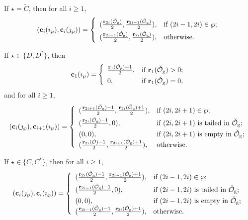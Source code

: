\documentclass[12pt,a4paper]{amsart}
\newcommand{\CO}{{\mathcal {O}}}
\numberwithin{equation}{section}
\theoremstyle{remark}
\begin{document}
If $\star=\widetilde{C}$, then for all $i\geq 1$,
\[
(\mathbf c_{i}(\imath_\wp), \mathbf c_{i}(\jmath_\wp))=
   \left\{
     \begin{array}{ll}
           (\frac{\mathbf r_{2i}(\check \CO_{\mathrm g})}{2},  \frac{\mathbf r_{2i-1}(\check \CO_{\mathrm g})}{2}), &\hbox{if $(2i-1, 2i)\in \wp$}; \smallskip\\
            (\frac{\mathbf r_{2i-1}(\check \CO_{\mathrm g})}{2},  \frac{\mathbf r_{2i}(\check \CO_{\mathrm g})}{2}), &\hbox{otherwise}.\\
            \end{array}
   \right.
\]


If $\star\in\{D,D^*\}$, then
 \[
   \mathbf c_{1}(\imath_\wp)= \left\{
     \begin{array}{ll}
            \frac{\mathbf r_1(\check \CO_{\mathrm g})+1}{2},   &\hbox{if $\mathbf r_1(\check \CO_{\mathrm g})>0$}; \smallskip\\
       0,  &\hbox{if $\mathbf r_1(\check \CO_{\mathrm g})=0$},\\
            \end{array}
   \right.
 \]
and for all $i\geq 1$,
\[
(\mathbf c_{i}(\jmath_\wp), \mathbf c_{i+1}(\imath_\wp))=
   \left\{
     \begin{array}{ll}
            (\frac{\mathbf r_{2i+1}(\check \CO_{\mathrm g})-1}{2},  \frac{\mathbf r_{2i}(\check \CO_{\mathrm g})+1}{2}), &\hbox{if $(2i, 2i+1)\in \wp$}; \smallskip\\
        (\frac{\mathbf r_{2i}(\check \CO_{\mathrm g})-1}{2},  0), & \hbox{if $(2i, 2i+1)$ is tailed in $\check \CO_{\mathrm g}$};\smallskip\\
         (0,  0), &\hbox{if $(2i, 2i+1)$ is empty in $\check \CO_{\mathrm g}$};\\
         (\frac{\mathbf r_{2i}(\check \CO)-1}{2},  \frac{\mathbf r_{2i+1}(\check \CO_{\mathrm g})+1}{2}), &\hbox{otherwise}.\\
            \end{array}
   \right.
\]


If $\star\in\{C,C^*\}$, then for all $i\geq 1$,
\[
(\mathbf c_{i}(\jmath_\wp), \mathbf c_{i}(\imath_\wp))=
   \left\{
     \begin{array}{ll}
            (\frac{\mathbf r_{2i}(\check \CO_{\mathrm g})-1}{2},  \frac{\mathbf r_{2i-1}(\check \CO_{\mathrm g})+1}{2}), &\hbox{if $(2i-1, 2i)\in \wp$}; \smallskip\\
        (\frac{\mathbf r_{2i-1}(\check \CO_{\mathrm g})-1}{2},  0), & \hbox{if $(2i-1, 2i)$ is tailed in $\check \CO_{\mathrm g}$};\smallskip\\
         (0,  0), &\hbox{if $(2i-1, 2i)$ is empty in $\check \CO_{\mathrm g}$};\\
         (\frac{\mathbf r_{2i-1}(\check \CO_{\mathrm g})-1}{2},  \frac{\mathbf r_{2i}(\check \CO_{\mathrm g})+1}{2}), &\hbox{otherwise}.\\
            \end{array}
   \right.
\]
\end{document}
